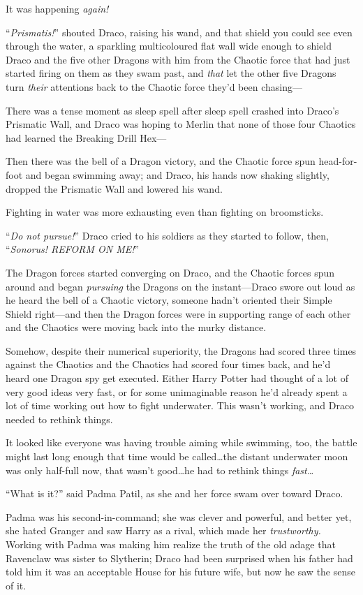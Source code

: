 It was happening \emph{again!}

“\emph{Prismatis!}” shouted Draco, raising his wand, and that shield you could see even through the water, a sparkling multicoloured flat wall wide enough to shield Draco and the five other Dragons with him from the Chaotic force that had just started firing on them as they swam past, and \emph{that} let the other five Dragons turn \emph{their} attentions back to the Chaotic force they’d been chasing—

There was a tense moment as sleep spell after sleep spell crashed into Draco’s Prismatic Wall, and Draco was hoping to Merlin that none of those four Chaotics had learned the Breaking Drill Hex—

Then there was the bell of a Dragon victory, and the Chaotic force spun head-for-foot and began swimming away; and Draco, his hands now shaking slightly, dropped the Prismatic Wall and lowered his wand.

Fighting in water was more exhausting even than fighting on broomsticks.

“\emph{Do not pursue!}” Draco cried to his soldiers as they started to follow, then, “\emph{Sonorus! REFORM ON ME!}”

The Dragon forces started converging on Draco, and the Chaotic forces spun around and began \emph{pursuing} the Dragons on the instant—Draco swore out loud as he heard the bell of a Chaotic victory, someone hadn’t oriented their Simple Shield right—and then the Dragon forces were in supporting range of each other and the Chaotics were moving back into the murky distance.

Somehow, despite their numerical superiority, the Dragons had scored three times against the Chaotics and the Chaotics had scored four times back, and he’d heard one Dragon spy get executed. Either Harry Potter had thought of a lot of very good ideas very fast, or for some unimaginable reason he’d already spent a lot of time working out how to fight underwater. This wasn’t working, and Draco needed to rethink things.

It looked like everyone was having trouble aiming while swimming, too, the battle might last long enough that time would be called…the distant underwater moon was only half-full now, that wasn’t good…he had to rethink things \emph{fast…}

“What is it?” said Padma Patil, as she and her force swam over toward Draco.

Padma was his second-in-command; she was clever and powerful, and better yet, she hated Granger and saw Harry as a rival, which made her \emph{trustworthy.} Working with Padma was making him realize the truth of the old adage that Ravenclaw was sister to Slytherin; Draco had been surprised when his father had told him it was an acceptable House for his future wife, but now he saw the sense of it.

